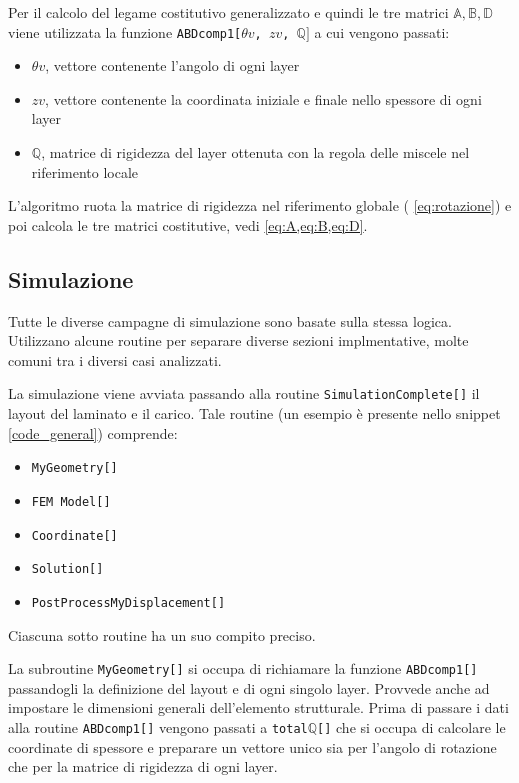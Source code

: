 \documentclass[a4paper,num-refs]{oup-contemporary}
\begin{document}
Per il calcolo del legame costitutivo generalizzato e quindi le tre matrici $\mathbb A, \mathbb B, \mathbb D$ viene utilizzata la funzione \texttt{ABDcomp1[$\theta v$, $zv$, $\mathbb Q]$} a cui vengono passati:
\begin{itemize}
	\item \texttt{$\theta v$}, vettore contenente l'angolo di ogni layer
	\item \texttt{$zv$}, vettore contenente la coordinata iniziale e finale nello spessore di ogni layer
	\item \texttt{$\mathbb Q$}, matrice di rigidezza del layer ottenuta con la regola delle miscele nel riferimento locale
\end{itemize}

L'algoritmo ruota la matrice di rigidezza nel riferimento globale ( \cref{eq:rotazione}) e poi calcola le tre matrici costitutive, vedi \cref{eq:A,eq:B,eq:D}.



\subsection{Simulazione}

Tutte le diverse campagne di simulazione sono basate sulla stessa logica. Utilizzano alcune routine per separare diverse sezioni implmentative, molte comuni tra i diversi casi analizzati.

La simulazione viene avviata passando alla routine \texttt{SimulationComplete[]} il layout del laminato e il carico. Tale routine (un esempio è presente nello snippet \ref{code_general}) comprende:
\begin{itemize}
	\item \texttt{MyGeometry[]}
	\item \texttt{FEM Model[]}
   \item \texttt{Coordinate[]}
	\item \texttt{Solution[]}
	\item \texttt{PostProcessMyDisplacement[]}
\end{itemize}

Ciascuna sotto routine ha un suo compito preciso. 

La subroutine \texttt{MyGeometry[]} si occupa di richiamare la funzione \texttt{ABDcomp1[]}  passandogli la definizione  del layout e di ogni singolo layer.  Provvede anche ad impostare le dimensioni generali dell'elemento strutturale. Prima di passare i dati alla routine \texttt{ABDcomp1[]} vengono passati a \texttt{total$\mathbb Q$[]} che si occupa di calcolare le coordinate di spessore e preparare un vettore unico sia per l'angolo di rotazione che per la matrice di rigidezza di ogni layer.
\end{document}

